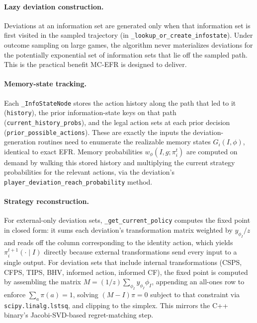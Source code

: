 \documentclass[11pt]{article}
\begin{document}
\paragraph{Lazy deviation construction.} Deviations at an information set are generated only when that information set is first visited in the sampled trajectory (in \texttt{\_lookup\_or\_create\_infostate}). Under outcome sampling on large games, the algorithm never materializes deviations for the potentially exponential set of information sets that lie off the sampled path. This is the practical benefit MC-EFR is designed to deliver.

\paragraph{Memory-state tracking.} Each \texttt{\_InfoStateNode} stores the action history along the path that led to it (\texttt{history}), the prior information-state keys on that path (\texttt{current\_history\_probs}), and the legal action sets at each prior decision (\texttt{prior\_possible\_actions}). These are exactly the inputs the deviation-generation routines need to enumerate the realizable memory states $G_i(I,\phi)$, identical to exact EFR. Memory probabilities $w_\phi(I, g; \pi_i^t)$ are computed on demand by walking this stored history and multiplying the current strategy probabilities for the relevant actions, via the deviation's \texttt{player\_deviation\_reach\_probability} method.

\paragraph{Strategy reconstruction.} For external-only deviation sets, \texttt{\_get\_current\_policy} computes the fixed point in closed form: it sums each deviation's transformation matrix weighted by $y_{\phi_I}/z$ and reads off the column corresponding to the identity action, which yields $\pi_i^{t+1}(\cdot \mid I)$ directly because external transformations send every input to a single output. For deviation sets that include internal transformations (CSPS, CFPS, TIPS, BHV, informed action, informed CF), the fixed point is computed by assembling the matrix $M = (1/z) \sum_{\phi_I} y_{\phi_I} \phi_I$, appending an all-ones row to enforce $\sum_a \pi(a) = 1$, solving $(M - I)\pi = 0$ subject to that constraint via \texttt{scipy.linalg.lstsq}, and clipping to the simplex. This mirrors the C++ binary's Jacobi-SVD-based regret-matching step.
\end{document}
